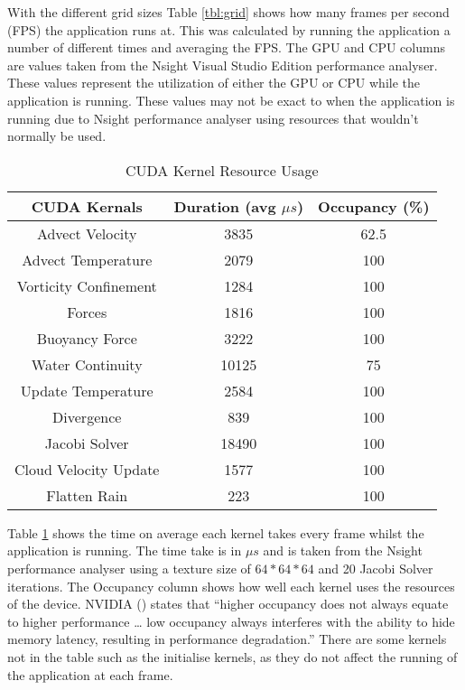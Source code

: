 With the different grid sizes Table \ref{tbl:grid} shows how many frames per second (FPS) the application runs at.
This was calculated by running the application a number of different times and averaging the FPS.
The GPU and CPU columns are values taken from the Nsight Visual Studio Edition performance analyser.
These values represent the utilization of either the GPU or CPU while the application is running.
These values may not be exact to when the application is running due to Nsight performance analyser using resources that wouldn't normally be used.

\begin{table}[h]
\centering
\centering\caption{CUDA Kernel Resource Usage}
\label{tbl:ck}
    \begin{tabular}{c|cc}
    \bf{CUDA Kernals} & \bf{Duration} (avg $\mu s$) & \bf{Occupancy} (\%) \\ \hline\hline
    Advect Velocity        & 3835                         & 62.5           \\
    Advect Temperature     & 2079                         & 100            \\
    Vorticity Confinement  & 1284                         & 100            \\
    Forces				   & 1816                         & 100            \\
    Buoyancy Force         & 3222                         & 100            \\
    Water Continuity       & 10125                        & 75             \\
    Update Temperature     & 2584                         & 100            \\
    Divergence             & 839                          & 100            \\
    Jacobi Solver          & 18490                        & 100            \\
    Cloud Velocity Update  & 1577                         & 100            \\
    Flatten Rain  		   & 223                          & 100            \\
    \end{tabular}
\end{table}

Table \ref{tbl:ck} shows the time on average each kernel takes every frame whilst the application is running.
The time take is in $\mu s$ and is taken from the Nsight performance analyser using a texture size of $64*64*64$ and 20 Jacobi Solver iterations.
The Occupancy column shows how well each kernel uses the resources of the device.
NVIDIA (\citeyear{nvsns2012}) states that “higher occupancy does not always equate to higher performance … low occupancy always interferes with the ability to hide memory latency, resulting in performance degradation.”
There are some kernels not in the table such as the initialise kernels, as they do not affect the running of the application at each frame.
